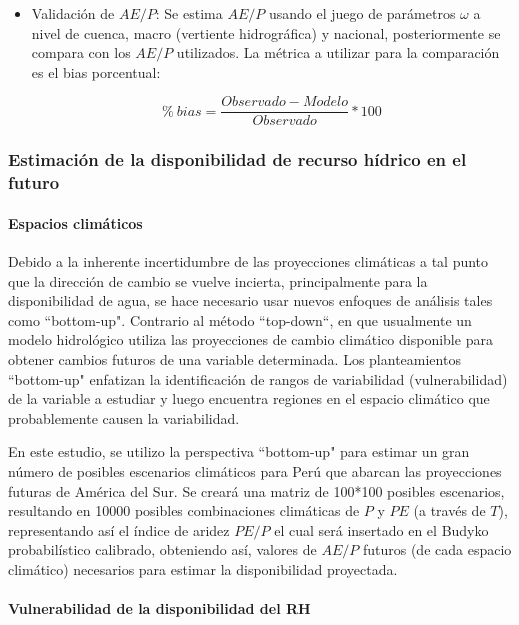 \documentclass[12pt]{article}
\begin{document}
\begin{itemize}
  \item Validación de $AE/P$: Se estima $AE/P$ usando el juego de parámetros $\omega$ a nivel de cuenca, macro (vertiente hidrográfica) y nacional, posteriormente se compara con los $AE/P$ utilizados. La métrica a utilizar para la comparación es el bias porcentual:
  
    \begin{equation}
    \%\ bias = \frac{Observado-Modelo}{Observado}*100
    \end{equation}
\end{itemize}


\subsubsection{Estimación de la disponibilidad de recurso hídrico en el futuro}

\paragraph{Espacios climáticos}\mbox{}

Debido a la inherente incertidumbre de las proyecciones climáticas a tal punto que la dirección de cambio se vuelve incierta, principalmente para la disponibilidad de agua, se hace necesario usar nuevos enfoques de análisis tales como “bottom-up". Contrario al método “top-down“, en que usualmente un modelo hidrológico utiliza las proyecciones de cambio climático disponible para obtener cambios futuros de una variable determinada. Los planteamientos “bottom-up" enfatizan la identificación de rangos de variabilidad (vulnerabilidad) de la variable a estudiar y luego encuentra regiones en el espacio climático que probablemente causen la variabilidad.

En este estudio, se utilizo la perspectiva “bottom-up" para estimar un gran número de posibles escenarios climáticos para Perú que abarcan las proyecciones futuras de América del Sur. Se creará una matriz de 100*100 posibles escenarios, resultando en 10000 posibles combinaciones climáticas de $P$ y $PE$ (a través de $T$), representando así el índice de aridez $PE/P$ el cual será insertado en el Budyko probabilístico calibrado, obteniendo así, valores de $AE/P$ futuros (de cada espacio climático) necesarios para estimar la disponibilidad proyectada.

\paragraph{Vulnerabilidad de la disponibilidad del RH}\mbox{}
\end{document}
